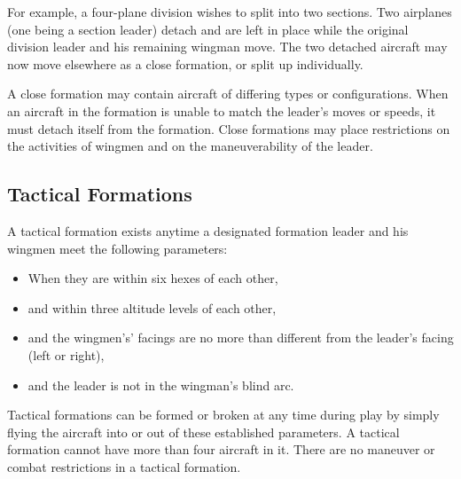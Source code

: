 \begin{advancedrules}
    For example, a four-plane division wishes to split into two sections. Two airplanes (one being a section leader) detach and are left in place while the original division leader and his remaining wingman move. The two detached aircraft may now move elsewhere as a close formation, or split up individually.

    A close formation may contain aircraft of differing types or configurations. When an aircraft in the formation is unable to match the leader's moves or speeds, it must detach itself from the formation. Close formations may place restrictions on the activities of wingmen and on the maneuverability of the leader.

    \subsection{Tactical Formations}

    A tactical formation exists anytime a designated formation leader and his wingmen meet the following parameters:

    \begin{itemize}
        \item When they are within six hexes of each other,
        \item and within three altitude levels of each other,
        \item and the wingmen’s' facings are no more than  different from the leader's facing (left or right),
        \item and the leader is not in the wingman's blind arc.
    \end{itemize}

    Tactical formations can be formed or broken at any time during play by simply flying the aircraft into or out of these established parameters. A tactical formation cannot have more than four aircraft in it. There are no maneuver or combat restrictions in a tactical formation.

\end{advancedrules}